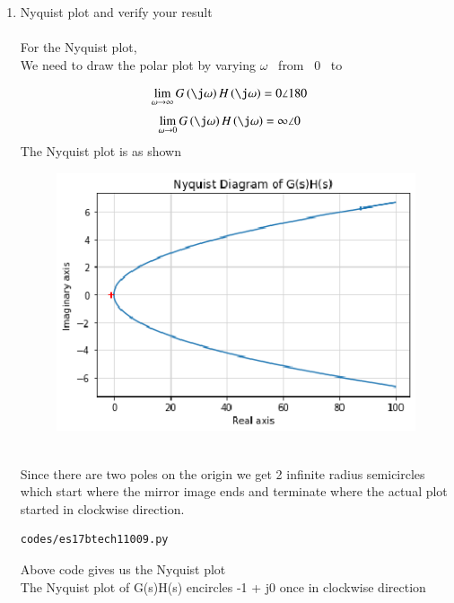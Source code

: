 \begin{enumerate}[label=\thesection.\arabic*.,ref=\thesection.\theenumi]
\item Nyquist plot and verify your result
\\
\solution
\\ For the Nyquist plot, 
\\
We need to draw the polar plot by varying $\omega$  \ from \ 0 \ to  \ \infty

\begin{align}
 \lim_{\omega\to \infty}{G\brak{\j\omega}H\brak{\j\omega}} &= 0\angle{180}
\end{align}
\begin{align}
\lim_{\omega\to 0}{G\brak{\j\omega}H\brak{\j\omega}} &= \infty\angle{0}
\end{align}
The Nyquist plot is as shown

\begin{figure}[!h]
\centering
\includegraphics[width=\columnwidth]{./figs/es17btech11009.eps}
\caption{}
\label{fig:es17btech11009_1}
\end{figure}
\\
Since there are two poles on the origin we get 2 infinite radius semicircles which start where the mirror image ends and terminate where the actual plot started in clockwise direction.
\begin{lstlisting}
codes/es17btech11009.py
\end{lstlisting}

 Above code gives us the Nyquist plot
\\

The Nyquist plot of G(s)H(s) encircles -1 + j0 once in clockwise direction


\end{enumerate}
